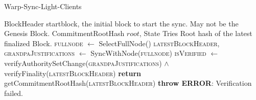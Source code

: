 
\begin{algorithm}
\caption{Warp-Sync-Light-Clients}
\begin{algorithmic}
    \INPUT BlockHeader startblock, the initial block to start the sync. May not be the Genesis Block. 
    \OUTPUT CommitmentRootHash $root$, State Tries Root hash of the latest finalized Block. 
    \STATE \textsc{fullnode} $\leftarrow$ SelectFullNode() 
    \STATE \textsc{latestBlockHeader}, \textsc{grandpaJustifications} $\leftarrow$ SyncWithNode(\textsc{fullnode}) 
    \STATE \textsc{isVerified} $\leftarrow$ verifyAuthoritySetChange(\textsc{grandpaJustifications}) $\land$ verifyFinality(\textsc{latestBlockHeader})
        \STATE \textbf{return} getCommitmentRootHash(\textsc{latestBlockHeader})
    \ELSE
        \STATE \textbf{throw ERROR}: Verification failed.
    \ENDIF
\end{algorithmic}
\end{algorithm}
